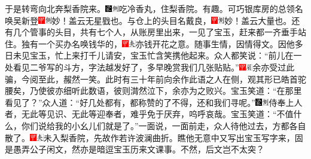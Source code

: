 于是转弯向北奔梨香院来。{\includegraphics[width=3mm]{../Images/00006}\includegraphics[width=3mm]{../Images/00011}\footnotesize \kaishu 吃冷香丸，住梨香院。有趣。}可巧银库房的总领名唤吴新登{\includegraphics[width=3mm]{../Images/00002}\includegraphics[width=3mm]{../Images/00011}\footnotesize \kaishu 妙！盖云无星戥也。}与仓上的头目名戴良，{\includegraphics[width=3mm]{../Images/00002}\includegraphics[width=3mm]{../Images/00011}\footnotesize \kaishu 妙！盖云大量也。}还有几个管事的头目，共有七个人，从账房里出来，一见了宝玉，赶来都一齐垂手站住。独有一个买办名唤钱华的，{\includegraphics[width=3mm]{../Images/00002}\includegraphics[width=3mm]{../Images/00012}\footnotesize \kaishu 亦钱开花之意。随事生情，因情得文。}因他多日未见宝玉，忙上来打千儿请安，宝玉忙含笑携他起来。众人都笑说：``前儿在一处看见二爷写的斗方，字法越发好了，多早晚赏我们几张贴贴。''{\includegraphics[width=3mm]{../Images/00002}\includegraphics[width=3mm]{../Images/00010}\footnotesize \kaishu 余亦受过此骗，今阅至此，赧然一笑。此时有三十年前向余作此语之人在侧，观其形已皓首驼腰矣，乃使彼亦细听此数语，彼则潸然泣下，余亦为之败兴。}宝玉笑道：``在那里看见了？''众人道：``好几处都有，都称赞的了不得，还和我们寻呢。''{\includegraphics[width=3mm]{../Images/00006}\includegraphics[width=3mm]{../Images/00011}\footnotesize \kaishu 侍奉上人者，无此等见识、无此等迎奉者，难乎免于厌弃，呜呼哀哉。}宝玉笑道：``不值什么，你们说给我的小幺儿们就是了。''一面说，一面前走，众人待他过去，方都各自散了。{\includegraphics[width=3mm]{../Images/00002}\includegraphics[width=3mm]{../Images/00012}\footnotesize \kaishu 未入梨香院，先故作若许波澜曲折。瞧他无意中又写出宝玉写字来，固是愚弄公子闲文，然亦是暗逗宝玉历来文课事。不然，后文岂不太突？}

